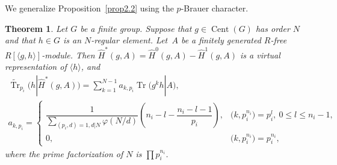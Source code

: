 \documentclass[10pt,a4paper]{amsart}
\numberwithin{equation}{section}
\newtheorem{Theorem}{Theorem}[section]
\begin{document}
We generalize Proposition~\ref{prop2.2} \cite[Proposition~2.2]{BR} using the $p$-Brauer character.


\begin{Theorem} \label{2.2kai}
Let $G$ be a finite group. Suppose that $g \in \operatorname{Cent}(G)$ has order $N$ and that $h \in G$ is an $N$-regular element. Let~$A$ be a finitely generated $R$-free $R[\langle g,h \rangle]$-module. Then $\hat{H}^*(g,A)=\hat{H}^0(g,A)-\hat{H}^1(g,A)$ is a virtual representation of $\langle h \rangle$, and
\begin{gather*}
\widetilde{\operatorname{Tr}}_{p_i}(h|\hat{H}^*(g,A))=\sum_{k=1}^{N-1}a_{k,p_i}\operatorname{Tr}\big(g^kh|A\big) ,
\\
a_{k,p_i}=\begin{cases}
\dfrac{1}{\sum_{(p_i,d)=1,d|N}\varphi (N/d)}\left(n_i-l-\dfrac{n_i-l-1}{p_i}\right), & \big(k,p_i^{n_i}\big)=p_i^l, \ 0\leq l \leq n_i-1, \\
0, & \big(k,p_i^{n_i}\big)=p_i^{n_i},
\end{cases}
\end{gather*}
where the prime factorization of $N$ is $\prod p_i^{n_i}$.
\end{Theorem}
\end{document}
